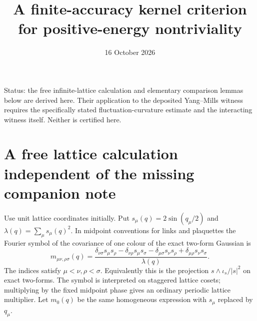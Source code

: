\documentclass[11pt]{article}
\begin{document}
\title{A finite-accuracy kernel criterion for positive-energy nontriviality}
\date{16 October 2026}\maketitle
\noindent Status: the free infinite-lattice calculation and elementary
comparison lemmas below are derived here. Their application to the deposited
Yang--Mills witness requires the specifically stated fluctuation-curvature
estimate and the interacting witness itself. Neither is certified here.

\section{A free lattice calculation independent of the missing companion note}

Use unit lattice coordinates initially. Put
$s_\mu(q)=2\sin(q_\mu/2)$ and $\lambda(q)=\sum_\mu s_\mu(q)^2$.
In midpoint conventions for links and plaquettes the Fourier symbol of the
covariance of one colour of the exact two-form Gaussian is
\[
m_{\mu\nu,\rho\sigma}(q)=
\frac{\delta_{\nu\sigma}s_\mu s_\rho-\delta_{\nu\rho}s_\mu s_\sigma
-\delta_{\mu\sigma}s_\nu s_\rho+\delta_{\mu\rho}s_\nu s_\sigma}
{\lambda(q)}.
\]
The indices satisfy $\mu<\nu,\rho<\sigma$. Equivalently this is the
projection $s\wedge\iota_s/|s|^2$ on exact two-forms.
The symbol is interpreted on staggered lattice cosets; multiplying by
the fixed midpoint phase gives an ordinary periodic lattice multiplier.
Let $m_0(q)$ be the same homogeneous expression with $s_\mu$ replaced by
$q_\mu$.
\end{document}
